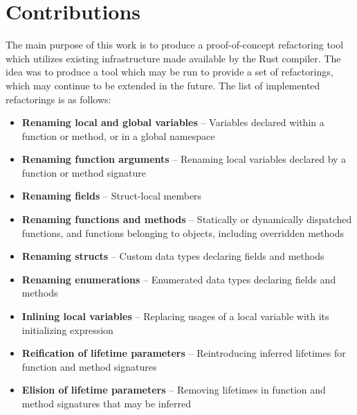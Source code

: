 
\section{Contributions}\label{S:implemented}
The main purpose of this work is to produce a proof-of-concept refactoring tool which utilizes existing infrastructure made available by the Rust compiler. The idea was to produce a tool which may be run to provide a set of refactorings, which may continue to be extended in the future. The list of implemented refactorings is as follows:


\begin{itemize}
\item {\bfseries Renaming local and global variables} -- Variables declared within a function or method, or in a global namespace
\item {\bfseries Renaming function arguments} -- Renaming local variables declared by a function or method signature
\item {\bfseries Renaming fields} -- Struct-local members
\item {\bfseries Renaming functions and methods} -- Statically or dynamically dispatched functions, and functions belonging to objects, including overridden methods
\item {\bfseries Renaming structs} -- Custom data types declaring fields and methods
\item {\bfseries Renaming enumerations} -- Enumerated data types declaring fields and methods
\item {\bfseries Inlining local variables} -- Replacing usages of a local variable with its initializing expression
\item {\bfseries Reification of lifetime parameters} -- Reintroducing inferred lifetimes for function and method signatures
\item {\bfseries Elision of lifetime parameters} -- Removing lifetimes in function and method signatures that may be inferred 
\end{itemize}

